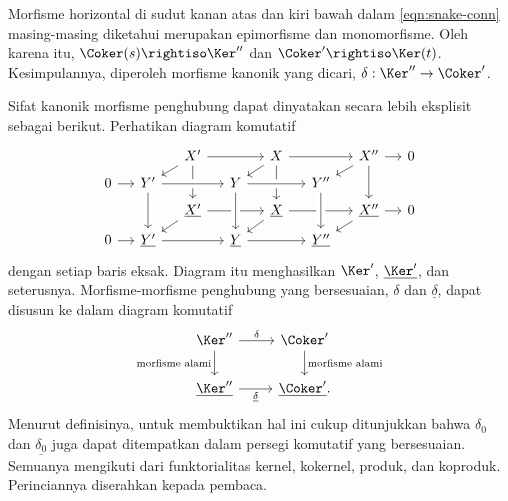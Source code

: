 Morfisme horizontal di sudut kanan atas dan kiri bawah dalam
\eqref{eqn:snake-conn} masing-masing diketahui merupakan epimorfisme dan
monomorfisme. Oleh karena itu,
$\Coker(s) \rightiso \Ker''$ dan $\Coker' \rightiso \Ker(t)$. Kesimpulannya,
diperoleh morfisme kanonik yang dicari, $\delta: \Ker'' \to \Coker'$.

\begin{catatan}\label{rem:connecting-canonical}
	Sifat kanonik morfisme penghubung dapat dinyatakan secara lebih eksplisit
	sebagai berikut. Perhatikan diagram komutatif
	\[\begin{tikzcd}[row sep=tiny, column sep=small]
		& & X' \arrow[rr] \arrow[ld] \arrow[dd] & & X \arrow[rr] \arrow[ld] \arrow[dd] & & X'' \arrow[r] \arrow[ld] \arrow[dd] & 0 \\
		0 \arrow[r] & Y' \arrow[rr, crossing over] & & Y \arrow[rr, crossing over] & & Y'' & & \\
		& & \underline{X'} \arrow[rr] \arrow[ld] & & \underline{X} \arrow[rr] \arrow[ld] & & \underline{X''} \arrow[ld] \arrow[r] & 0 \\
		0 \arrow[r] & \underline{Y'} \arrow[rr] \arrow[leftarrow, uu, crossing over] & & \underline{Y} \arrow[rr] \arrow[leftarrow, uu, crossing over] & & \underline{Y''} \arrow[leftarrow, uu, crossing over] & &
	\end{tikzcd}\]
	dengan setiap baris eksak. Diagram itu menghasilkan $\Ker'$,
	$\underline{\Ker'}$, dan seterusnya. Morfisme-morfisme penghubung yang
	bersesuaian, $\delta$ dan $\underline{\delta}$, dapat disusun ke dalam
	diagram komutatif
	\[\begin{tikzcd}
		\Ker'' \arrow[r, "\delta"] \arrow[d, "\text{morfisme alami}"'] & \Coker' \arrow[d, "\text{morfisme alami}"] \\
		\underline{\Ker''} \arrow[r, "\underline{\delta}"'] & \underline{\Coker'} .
	\end{tikzcd}\]
	Menurut definisinya, untuk membuktikan hal ini cukup ditunjukkan bahwa
	$\delta_0$ dan $\underline{\delta_0}$ juga dapat ditempatkan dalam persegi
	komutatif yang bersesuaian. Semuanya mengikuti dari funktorialitas kernel,
	kokernel, produk, dan koproduk. Perinciannya diserahkan kepada pembaca.
\end{catatan}

